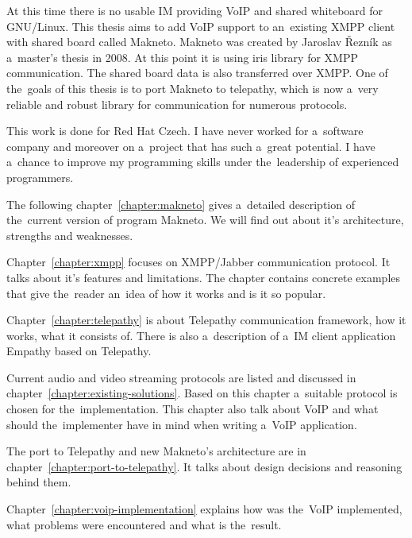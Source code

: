 At this time there is no usable IM providing VoIP and shared whiteboard for GNU/Linux. This thesis aims to add VoIP support to an~existing XMPP client with shared board called Makneto. Makneto was created by Jaroslav Řezník as a~master's thesis in 2008. At this point it is using iris library for XMPP communication. The shared board data is also transferred over XMPP. One of the~goals of this thesis is to port Makneto to telepathy, which is now a~very reliable and robust library for communication for numerous protocols.  

This work is done for Red Hat Czech. I have never worked for a~software company and moreover on a~project that has such a~great potential. I have a~chance to improve my programming skills under the~leadership of experienced programmers.

The following chapter~\ref{chapter:makneto} gives a~detailed description of the~current version of program Makneto. We will find out about it's architecture, strengths and weaknesses. 

Chapter~\ref{chapter:xmpp} focuses on XMPP/Jabber communication protocol. It talks about it's features and limitations. The chapter contains concrete examples that give the~reader an~idea of how it works and is it so popular.

Chapter~\ref{chapter:telepathy} is about Telepathy communication framework, how it works, what it consists of. There is also a~description of a~IM client application Empathy based on Telepathy. 

Current audio and video streaming protocols are listed and discussed in chapter~\ref{chapter:existing-solutions}. Based on this chapter a~suitable protocol is chosen for the~implementation. This chapter also talk about VoIP and what should the~implementer have in mind when writing a~VoIP application.

The port to Telepathy and new Makneto's architecture are in chapter~\ref{chapter:port-to-telepathy}. It talks about design decisions and reasoning behind them. 

Chapter~\ref{chapter:voip-implementation} explains how was the~VoIP implemented, what problems were encountered and what is the~result.  




